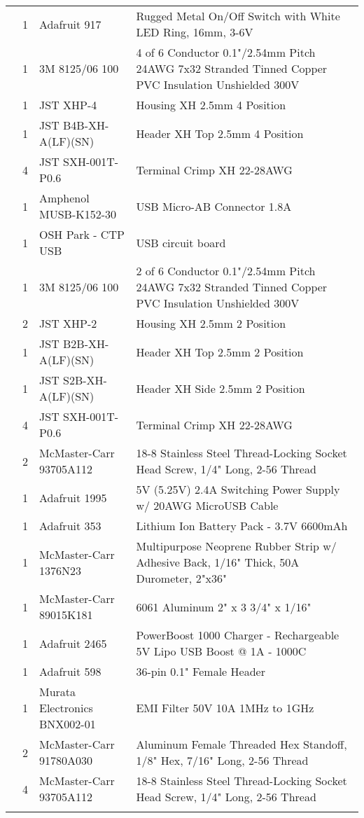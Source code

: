 \begin{longtabu}{X[3,c,m] X[1,c,m] X[3,c,m] X[5,l,m]}
   & 1 & Adafruit 917 & Rugged Metal On/Off Switch with White LED Ring, 16mm, 3-6V \\
  & 1 & 3M 8125/06 100 & 4 of 6 Conductor 0.1"/2.54mm Pitch 24AWG 7x32 Stranded Tinned Copper PVC Insulation Unshielded 300V \\
  & 1 & JST XHP-4 & Housing XH 2.5mm 4 Position \\
  & 1 & JST B4B-XH-A(LF)(SN) & Header XH Top 2.5mm 4 Position \\
  & 4 & JST SXH-001T-P0.6 & Terminal Crimp XH 22-28AWG \\ \mrule

   & 1 & Amphenol MUSB-K152-30 & USB Micro-AB Connector 1.8A \\
  & 1 & OSH Park - CTP USB & USB circuit board \\
  & 1 & 3M 8125/06 100 & 2 of 6 Conductor 0.1"/2.54mm Pitch 24AWG 7x32 Stranded Tinned Copper PVC Insulation Unshielded 300V \\
  & 2 & JST XHP-2 & Housing XH 2.5mm 2 Position \\
  & 1 & JST B2B-XH-A(LF)(SN) & Header XH Top 2.5mm 2 Position \\
  & 1 & JST S2B-XH-A(LF)(SN) & Header XH Side 2.5mm 2 Position \\
  & 4 & JST SXH-001T-P0.6 & Terminal Crimp XH 22-28AWG \\
  & 2 & McMaster-Carr 93705A112 & 18-8 Stainless Steel Thread-Locking Socket Head Screw, 1/4" Long, 2-56 Thread \\ \mrule

   & 1 & Adafruit 1995 & 5V (5.25V) 2.4A Switching Power Supply w/ 20AWG MicroUSB Cable \\ \mrule

   & 1 & Adafruit 353 & Lithium Ion Battery Pack - 3.7V 6600mAh \\
  & 1 & McMaster-Carr 1376N23 & Multipurpose Neoprene Rubber Strip w/ Adhesive Back, 1/16" Thick, 50A Durometer, 2"x36" \\
  & 1 & McMaster-Carr 89015K181 & 6061 Aluminum 2" x 3 3/4" x 1/16" \\ \mrule

   & 1 & Adafruit 2465 & PowerBoost 1000 Charger - Rechargeable 5V Lipo USB Boost @ 1A - 1000C \\
  & 1 & Adafruit 598 & 36-pin 0.1" Female Header \\
  & 1 & Murata Electronics BNX002-01 & EMI Filter 50V 10A 1MHz to 1GHz \\
  & 2 & McMaster-Carr 91780A030 & Aluminum Female Threaded Hex Standoff, 1/8" Hex, 7/16" Long, 2-56 Thread \\
  & 4 & McMaster-Carr 93705A112 & 18-8 Stainless Steel Thread-Locking Socket Head Screw, 1/4" Long, 2-56 Thread \\ \mrule


\end{longtabu}
